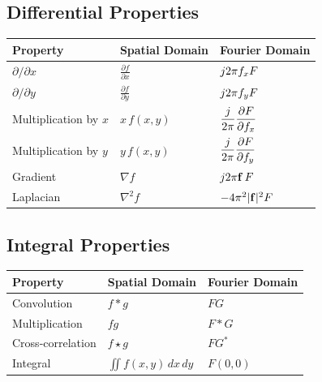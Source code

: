 \subsection{Differential Properties}

\begin{center}
\begin{tabular}{lll}
\toprule
Property & Spatial Domain & Fourier Domain\\
\midrule

$\partial/\partial x$
&
$\displaystyle
\frac{\partial f}{\partial x}
$
&
$j2\pi f_x F$

\\[0.4cm]

$\partial/\partial y$
&
$\displaystyle
\frac{\partial f}{\partial y}
$
&
$j2\pi f_y F$

\\[0.4cm]

Multiplication by $x$
&
$x\,f(x,y)$
&
$\displaystyle
\frac{j}{2\pi}
\frac{\partial F}{\partial f_x}
$

\\[0.5cm]

Multiplication by $y$
&
$y\,f(x,y)$
&
$\displaystyle
\frac{j}{2\pi}
\frac{\partial F}{\partial f_y}
$

\\[0.5cm]

Gradient
&
$\nabla f$
&
$j2\pi\mathbf{f}\,F$

\\[0.4cm]

Laplacian
&
$\nabla^2f$
&
$-4\pi^2|\mathbf{f}|^2F$

\\

\bottomrule
\end{tabular}
\end{center}

\subsection{Integral Properties}

\begin{center}
\begin{tabular}{lll}
\toprule
Property & Spatial Domain & Fourier Domain\\
\midrule

Convolution &
$f*g$
&
$FG$

\\[0.3cm]

Multiplication &
$fg$
&
$F*G$

\\[0.3cm]

Cross-correlation &
$f\star g$
&
$FG^*$

\\[0.3cm]
Integral &
$\displaystyle\iint f(x,y)\,dx\,dy$
&
$F(0,0)$

\\

\bottomrule
\end{tabular}
\end{center}

